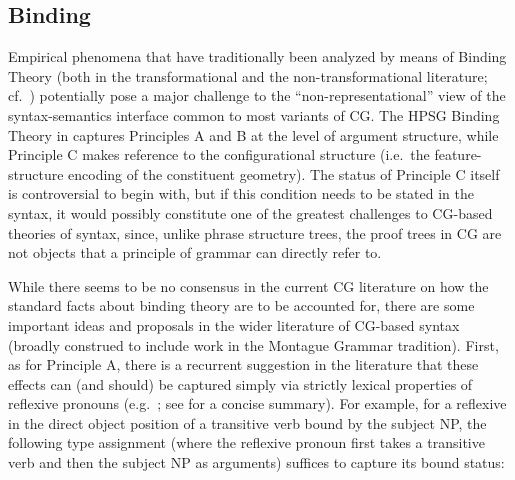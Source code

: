 \documentclass[output=paper
                ,modfonts
                ,nonflat
	        ,collection
	        ,collectionchapter
	        ,collectiontoclongg
 	        ,biblatex
                ,babelshorthands
                ,newtxmath
                ,draftmode
                ,colorlinks, citecolor=brown
]{./langsci/langscibook}
\begin{document}
\subsection{Binding}

Empirical phenomena that have traditionally been analyzed by means of
Binding Theory (both in the transformational and the
non-transformational literature; cf.~)
potentially pose a major challenge to the
``non-representational'' view of the syntax-semantics interface common
to most variants of CG. The HPSG Binding Theory in \citet{PS92a,ps2}
captures Principles A and B at the level of argument structure, while
Principle C makes reference to the configurational structure (i.e.\
the feature-structure encoding of the constituent geometry). The
status of Principle C itself is controversial to begin with, but if
this condition needs to be stated in the syntax, it would possibly
constitute one of the greatest challenges to CG-based theories of
syntax, since, unlike phrase structure trees, the proof trees in CG
are not objects that a principle of grammar can directly refer to.

While there seems to be no consensus in the current CG literature on
how the standard
facts about binding theory are to be accounted for, there are
some important ideas and proposals in the wider literature of CG-based
syntax (broadly construed to include work in the Montague Grammar
tradition). First, as for Principle A, there is a recurrent suggestion
in the literature that these effects can (and should) be captured
simply via strictly lexical properties of reflexive pronouns
(e.g.\  \citealt{szabolcsi1992}; see \citealt{buringbinding} for a concise summary).
For example, for a reflexive in the direct object position
of a transitive verb bound by the subject NP,
the following type assignment (where the reflexive pronoun first takes
a transitive verb and then the subject NP as arguments) suffices to
capture its bound status:

\begin{exe}
 \ex\label{SELF}
\end{exe}
\end{document}

